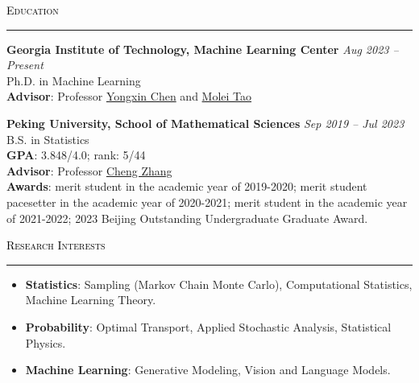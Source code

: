 \documentclass{resume} %
\renewenvironment{rSection}[1]{
\sectionskip
\textcolor{black}{\textsc{#1}}
\sectionlineskip
\hrule
\begin{list}{}{
\setlength{\leftmargin}{1.5em}
}
\item[]
}{
\end{list}
}
\begin{document}
\begin{rSection}{Education}
{\bf Georgia Institute of Technology, Machine Learning Center} \hfill {\em Aug 2023 -- Present} 
\\ Ph.D. in Machine Learning\hfill
\\ \textbf{Advisor}: Professor \href{https://yongxin.ae.gatech.edu/}{Yongxin Chen} and \href{https://mtao8.math.gatech.edu/index.html}{Molei Tao}

{\bf Peking University, School of Mathematical Sciences} \hfill {\em Sep 2019 -- Jul 2023} 
\\ B.S. in Statistics
\\ \textbf{GPA}: 3.848/4.0; rank: 5/44 \hfill
\\ \textbf{Advisor}: Professor \href{https://zcrabbit.github.io/}{Cheng Zhang} 
\\ \textbf{Awards}: merit student in the academic year of 2019-2020; merit student pacesetter in the academic year of 2020-2021; merit student in the academic year of 2021-2022; 2023 Beijing Outstanding Undergraduate Graduate Award.
\end{rSection}

\begin{rSection}{Research Interests}
    \begin{itemize}[leftmargin=0in]
        \item \textbf{Statistics}: Sampling (Markov Chain Monte Carlo), Computational Statistics, Machine Learning Theory.
        \item \textbf{Probability}: Optimal Transport, Applied Stochastic Analysis, Statistical Physics.
        \item \textbf{Machine Learning}: Generative Modeling, Vision and Language Models.
    \end{itemize}
\end{rSection}


\end{document}
